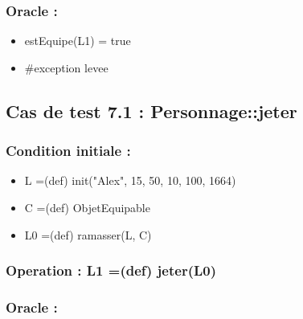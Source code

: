 \documentclass[11pt]{article}
\begin{document}
\subsubsection{Oracle :}
\label{sec-1.16.3}

\begin{itemize}

\item estEquipe(L1) = true\\
\label{sec-1.16.3.1}


\item \#exception levee\\
\label{sec-1.16.3.2}







\end{itemize} %
\subsection{Cas de test 7.1 : Personnage::jeter}
\label{sec-1.17}

\subsubsection{Condition initiale :}
\label{sec-1.17.1}

\begin{itemize}

\item L =(def) init("Alex", 15, 50, 10, 100, 1664)\\
\label{sec-1.17.1.1}


\item C =(def) ObjetEquipable\\
\label{sec-1.17.1.2}


\item L0 =(def) ramasser(L, C)\\
\label{sec-1.17.1.3}

\end{itemize} %
\subsubsection{Operation : L1 =(def) jeter(L0)}
\label{sec-1.17.2}

\subsubsection{Oracle :}
\label{sec-1.17.3}
\end{document}
